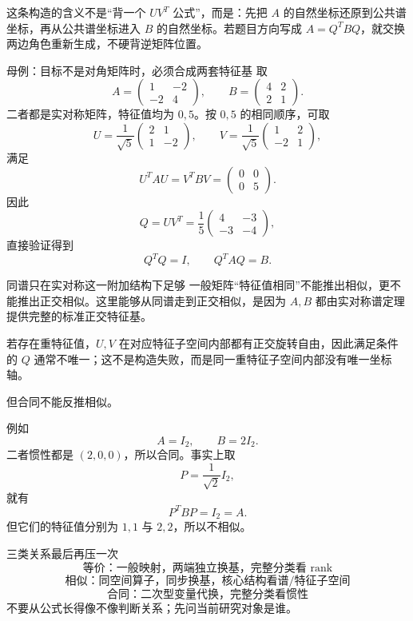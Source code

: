 \documentclass[11pt,a4paper]{ctexart}
\begin{document}
这条构造的含义不是“背一个 $UV^T$ 公式”，而是：先把 $A$ 的自然坐标还原到公共谱坐标，再从公共谱坐标进入 $B$ 的自然坐标。若题目方向写成 $A=Q^TBQ$，就交换两边角色重新生成，不硬背逆矩阵位置。

\begin{examplebox}{母例：目标不是对角矩阵时，必须合成两套特征基}
取
\[
A=\begin{pmatrix}1&-2\\-2&4\end{pmatrix},
\qquad
B=\begin{pmatrix}4&2\\2&1\end{pmatrix}.
\]
二者都是实对称矩阵，特征值均为 $0,5$。按 $0,5$ 的相同顺序，可取
\[
U=\frac1{\sqrt5}
\begin{pmatrix}2&1\\1&-2\end{pmatrix},
\qquad
V=\frac1{\sqrt5}
\begin{pmatrix}1&2\\-2&1\end{pmatrix},
\]
满足
\[
U^TAU=V^TBV=\begin{pmatrix}0&0\\0&5\end{pmatrix}.
\]
因此
\[
Q=UV^T
=\frac15
\begin{pmatrix}4&-3\\-3&-4\end{pmatrix},
\]
直接验证得到
\[
Q^TQ=I,
\qquad
Q^TAQ=B.
\]
\end{examplebox}

\begin{warnbox}{同谱只在实对称这一附加结构下足够}
一般矩阵“特征值相同”不能推出相似，更不能推出正交相似。这里能够从同谱走到正交相似，是因为 $A,B$ 都由实对称谱定理提供完整的标准正交特征基。

若存在重特征值，$U,V$ 在对应特征子空间内部都有正交旋转自由，因此满足条件的 $Q$ 通常不唯一；这不是构造失败，而是同一重特征子空间内部没有唯一坐标轴。
\end{warnbox}

但合同不能反推相似。

例如
\[
A=I_2,
\qquad B=2I_2.
\]
二者惯性都是 $(2,0,0)$，所以合同。事实上取
\[
P=\frac1{\sqrt2}I_2,
\]
就有
\[
P^TBP=I_2=A.
\]
但它们的特征值分别为 $1,1$ 与 $2,2$，所以不相似。

\begin{corebox}{三类关系最后再压一次}
\[
\boxed{\text{等价：一般映射，两端独立换基，完整分类看 rank}}
\]
\[
\boxed{\text{相似：同空间算子，同步换基，核心结构看谱/特征子空间}}
\]
\[
\boxed{\text{合同：二次型变量代换，完整分类看惯性}}
\]
不要从公式长得像不像判断关系；先问当前研究对象是谁。
\end{corebox}
\end{document}
